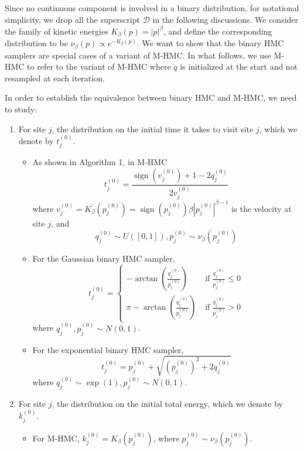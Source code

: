 \documentclass{article}
\newcommand{\cald}{\mathcal{D}}
\begin{document}
Since no continuous component is involved in a binary distribution, for notational simplicity, we drop all the superscript $\cald$ in the following discussions. We consider the family of kinetic energies $K_\beta(p)=|p|^\beta$, and define the corresponding distribution to be $\nu_\beta(p)\propto e^{-K_\beta(p)}$. We want to show that the binary HMC samplers are special cases of a variant of M-HMC. In what follows, we use M-HMC to refer to the variant of M-HMC where $q$ is initialized at the start and not resampled at each iteration. 

In order to establish the equivalence between binary HMC and M-HMC, we need to study:
\begin{enumerate}
  \item For site $j$, the distribution on the initial time it takes to visit site $j$, which we denote by $t^{(0)}_j$.
  \begin{itemize}
    \item As shown in Algorithm 1, in M-HMC
	    \[ t^{(0)}_j = \frac{\ensuremath{\operatorname{sign}} (v_j^{(0)}) + 1 - 2 q_j^{(0)}}{2 v_j^{(0)}} \]
    where $v_j^{(0)} = K_{\beta}^{'} (p_j^{(0)}) =\ensuremath{\operatorname{sign}} (p_j^{(0)}) \beta | p_j^{(0)} |^{\beta - 1}$ is the velocity at site $j$, and
    $$q_j^{(0)} \sim U ([0, 1]), p_j^{(0)} \sim \nu_\beta(p_j^{(0)})$$
    
    \item For the Gaussian binary HMC sampler,
    \[ t_j^{(0)} = \left\{\begin{array}{ll}
         - \arctan \left( \frac{q^{(0)}_j}{p^{(0)}_j} \right) &
         \ensuremath{\operatorname{if}} \frac{q^{(0)}_j}{p^{(0)}_j} \leqslant
         0\\
         \pi - \arctan \left( \frac{q^{(0)}_j}{p^{(0)}_j} \right) &
         \ensuremath{\operatorname{if}} \frac{q^{(0)}_j}{p^{(0)}_j} > 0
       \end{array}\right. \]
    where $q^{(0)}_j, p^{(0)}_j \sim N (0, 1)$.
    
    \item For the exponential binary HMC sampler,
    \[ t_j^{(0)} = p^{(0)}_j + \sqrt{(p^{(0)}_j)^2 + 2 q^{(0)}_j} \]
    where $q_j^{(0)} \sim \exp (1), p_j^{(0)} \sim N (0, 1)$.
  \end{itemize}
  \item For site $j$, the distribution on the initial total energy, which we denote by $k^{(0)}_j$.
  \begin{itemize}
    \item For M-HMC, $k_j^{(0)} = K_{\beta} (p_j^{(0)})$, where
	    $p_j^{(0)} \sim \nu_\beta(p_j^{(0)})$.
    

\end{itemize}
\end{enumerate}
\end{document}
